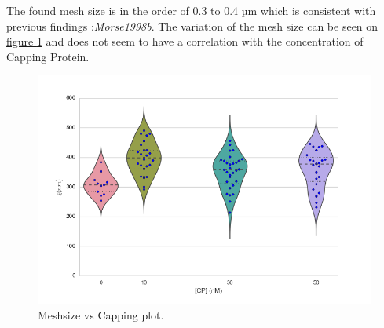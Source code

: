 \documentclass[A4paperpaper,11pt,english]{sphinxmanual}
\begin{document}
The found mesh size is in the order of 0.3 to 0.4 µm which is consistent with previous findings
:\emph{Morse1998b}. The variation of the
mesh size can be seen on \hyperref[index-latex:xi-violin]{figure  \ref*{index-latex:xi-violin}} and does not seem to have a
correlation with the concentration of Capping Protein.
\begin{figure}[htbp]
\centering
\capstart

\includegraphics[width=0.800\linewidth]{xi_violin.png}
\caption{Meshsize vs Capping plot.}\label{index-latex:xi-violin}\end{figure}
\end{document}
